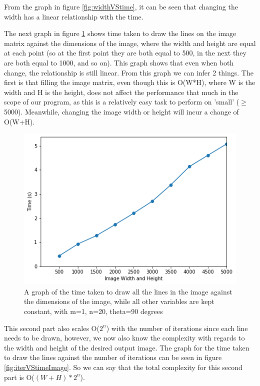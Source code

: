 From the graph in figure \ref{fig:widthVStime}, it can be seen that changing the width has a linear relationship with the time.

The next graph in figure \ref{fig:dimVStime} shows time taken to draw the lines on the image matrix against the dimensions of the image, where the width and height are equal at each point (so at the first point they are both equal to 500, in the next they are both equal to 1000, and so on). This graph shows that even when both change, the relationship is still linear. From this graph we can infer 2 things. The first is that filling the image matrix, even though this is O(W*H), where W is the width and H is the height, does not affect the performance that much in the scope of our program, as this is a relatively easy task to perform on 'small' ($\ge$5000). Meanwhile, changing the image width or height will incur a change of O(W+H).

\begin{figure}
	\label{fig:dimVStime}
	\includegraphics[width=\linewidth]{Images/dimVStime.png}
	\centering
	\caption{A graph of the time taken to draw all the lines in the image against the dimensions of the image, while all other variables are kept constant, with m=1, n=20, theta=90 degrees}
\end{figure}

This second part also scales O($2^n$) with the number of iterations since each line needs to be drawn, however, we now also know the complexity with regards to the width and height of the desired output image. The graph for the time taken to draw the lines against the number of iterations can be seen in figure \ref{fig:iterVStimeImage}. So we can say that the total complexity for this second part is O($(W+H)*2^n$).

